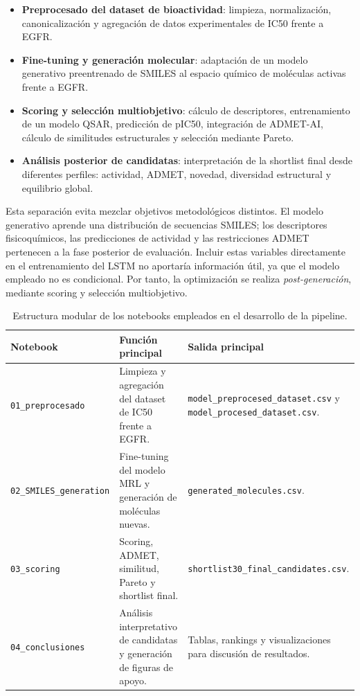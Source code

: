 \documentclass[IB]{TFUOC}%
\begin{document}
\begin{itemize}
    \item \textbf{Preprocesado del dataset de bioactividad}: limpieza, normalización, canonicalización y agregación de datos experimentales de IC50 frente a EGFR.
    \item \textbf{Fine-tuning y generación molecular}: adaptación de un modelo generativo preentrenado de SMILES al espacio químico de moléculas activas frente a EGFR.
    \item \textbf{Scoring y selección multiobjetivo}: cálculo de descriptores, entrenamiento de un modelo QSAR, predicción de pIC50, integración de ADMET-AI, cálculo de similitudes estructurales y selección mediante Pareto.
    \item \textbf{Análisis posterior de candidatas}: interpretación de la shortlist final desde diferentes perfiles: actividad, ADMET, novedad, diversidad estructural y equilibrio global.
\end{itemize}

Esta separación evita mezclar objetivos metodológicos distintos. El modelo generativo aprende una distribución de secuencias SMILES; los descriptores fisicoquímicos, las predicciones de actividad y las restricciones ADMET pertenecen a la fase posterior de evaluación. Incluir estas variables directamente en el entrenamiento del LSTM no aportaría información útil, ya que el modelo empleado no es condicional. Por tanto, la optimización se realiza \textit{post-generación}, mediante scoring y selección multiobjetivo.

\begin{table}[H]
    \centering
    \small
    \begin{tabular}{p{4.2cm} p{5.1cm} p{4.7cm}}
        \hline
        \textbf{Notebook} & \textbf{Función principal} & \textbf{Salida principal} \\
        \hline
        \texttt{01\_preprocesado} & Limpieza y agregación del dataset de IC50 frente a EGFR. & \texttt{model\_preprocesed\_dataset.csv} y \texttt{model\_procesed\_dataset.csv}. \\
        \hline
        \texttt{02\_SMILES\_generation} & Fine-tuning del modelo MRL y generación de moléculas nuevas. & \texttt{generated\_molecules.csv}. \\
        \hline
        \texttt{03\_scoring} & Scoring, ADMET, similitud, Pareto y shortlist final. & \texttt{shortlist30\_final\_candidates.csv}. \\
        \hline
        \texttt{04\_conclusiones} & Análisis interpretativo de candidatas y generación de figuras de apoyo. & Tablas, rankings y visualizaciones para discusión de resultados. \\
        \hline
    \end{tabular}
    \caption{Estructura modular de los notebooks empleados en el desarrollo de la pipeline.}
    \label{tab:notebooks_pipeline}
\end{table}
\end{document}
